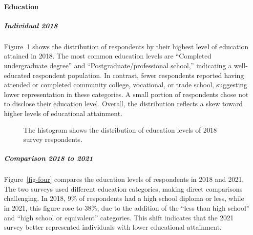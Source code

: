 \documentclass[
  letterpaper,
  DIV=11,
  numbers=noendperiod]{scrartcl}
\let\oldparagraph\paragraph
\renewcommand{\paragraph}[1]{\oldparagraph{#1}\mbox{}}
\let\oldsubparagraph\subparagraph
\renewcommand{\subparagraph}[1]{\oldsubparagraph{#1}\mbox{}}
\begin{document}
\paragraph{Education}\label{education}

\subparagraph{Individual 2018}\label{individual-2018-1}

Figure~\ref{fig-three} shows the distribution of respondents by their
highest level of education attained in 2018. The most common education
levels are ``Completed undergraduate degree'' and
``Postgraduate/professional school,'' indicating a well-educated
respondent population. In contrast, fewer respondents reported having
attended or completed community college, vocational, or trade school,
suggesting lower representation in these categories. A small portion of
respondents chose not to disclose their education level. Overall, the
distribution reflects a skew toward higher levels of educational
attainment.

\begin{figure}


\caption{\label{fig-three}The histogram shows the distribution of
education levels of 2018 survey respondents.}

\end{figure}%

\subparagraph{Comparison 2018 to 2021}\label{comparison-2018-to-2021-1}

Figure~\ref{fig-four} compares the education levels of respondents in
2018 and 2021. The two surveys used different education categories,
making direct comparisons challenging. In 2018, 9\% of respondents had a
high school diploma or less, while in 2021, this figure rose to 38\%,
due to the addition of the ``less than high school'' and ``high school
or equivalent'' categories. This shift indicates that the 2021 survey
better represented individuals with lower educational attainment.
\end{document}
